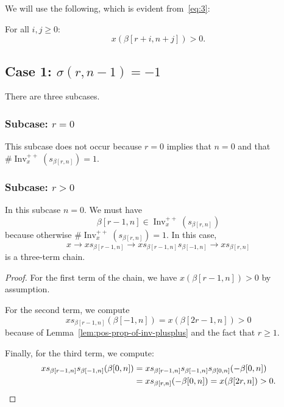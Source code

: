 \documentclass[ALCO,ThmDefs,Unicode]{cedram}
\DeclareMathOperator{\Inv}{Inv}
\newcommand{\Invplusplusx}{\Inv^{++}_x}
\begin{document}
We will use the following, which is evident from~\eqref{eq:3}:

\begin{lemm}\label{lem:pos-prop-of-inv-plusplus}
For all $i,j\geq 0$:
\begin{equation}\label{eq:55}
x(\beta[r+i,n+j]) > 0.
\end{equation}
\end{lemm}

\subsection{Case 1: \texorpdfstring{$\sigma(r,n-1) = -1$}{sigma(r,n-1) = -1}}

There are three subcases.

\subsubsection{Subcase: \texorpdfstring{$r = 0$}{r = 0}}

This subcase does not occur because $r=0$ implies that $n=0$ and that $\# \Invplusplusx(s_{\beta[r,n]}) = 1$.

\subsubsection{Subcase: \texorpdfstring{$r > 0$}{r > 0}}

In this subcase $n=0$. We must have
\begin{equation}\label{eq:59}
\beta[r-1,n] \in \Invplusplusx(s_{\beta[r,n]})
\end{equation}
because otherwise $\# \Invplusplusx(s_{\beta[r,n]}) = 1$. In this case,
\begin{equation}\label{eq:58}
x \rightarrow x s_{\beta[r-1,n]} \rightarrow x s_{\beta[r-1,n]}s_{\beta[-1,n]} \rightarrow x s_{\beta[r,n]}
\end{equation}
is a three-term chain.

\begin{proof}
For the first term of the chain, we have $x(\beta[r-1,n]) > 0$ by assumption.

For the second term, we compute
\begin{equation}\label{eq:61}
x s_{\beta[r-1,n]} (\beta[-1,n]) = x(\beta[2r-1,n]) >0
\end{equation}
because of Lemma~\ref{lem:pos-prop-of-inv-plusplus} and the fact that $r \geq 1$.

Finally, for the third term, we compute:
\begin{align}\label{eq:63}
xs_{\beta[r-1,n]}s_{\beta[-1,n]}(\beta[0,n]) &= xs_{\beta[r-1,n]}s_{\beta[-1,n]}s_{\beta[0,n]}(- \beta[0,n])\\
&= xs_{\beta[r,n]}(- \beta[0,n]) = x(\beta[2r,n])>0.\notag\qedhere
\end{align}
\end{proof}
\end{document}
